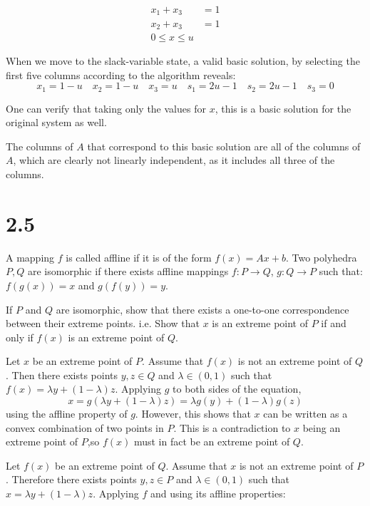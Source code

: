 \documentclass[12pt]{paper}
\begin{document}
\begin{align*}
  x_1 + x_3 &= 1\\
  x_2 + x_3 &= 1\\
  0 \leq x \leq u
\end{align*}

When we move to the slack-variable state, a valid basic solution, by
selecting the first five columns according to the algorithm reveals:
\begin{equation*}
  x_1 = 1 - u \quad x_2 = 1-u\quad x_3 = u\quad s_1 = 2u - 1\quad s_2 = 2u - 1\quad s_3 = 0
\end{equation*}

One can verify that taking only the values for $x$, this is a basic
solution for the original system as well.

The columns of $A$ that correspond to this basic solution are all of
the columns of $A$, which are clearly not linearly independent, as it
includes all three of the columns.



\section{2.5}

A mapping $f$ is called affline if it is of the form $f(x) = Ax +
b$. Two polyhedra $P,Q$ are isomorphic if there exists affline
mappings $f: P \rightarrow Q$, $g: Q \rightarrow P$ such that: $f(g(x))= x$ and $g(f(y)) =
y$.

If $P$ and $Q$ are isomorphic, show that there exists a one-to-one
correspondence between their extreme points. i.e. Show that $x$ is an
extreme point of $P$ if and only if $f(x)$ is an extreme point of $Q$.

\vspace{.3in}

Let $x$ be an extreme point of $P$. Assume that $f(x)$ is not an
extreme point of $Q$. Then there exists points $y,z \in Q$ and $\lambda \in
(0,1)$ such that $f(x) = \lambda y + (1-\lambda)z$. Applying $g$ to both sides of
the equation,
\begin{equation*}
  x = g(\lambda y + (1-\lambda)z) = \lambda g(y) + (1-\lambda)g(z)
\end{equation*}
using the affline property of $g$. However, this shows that $x$ can be
written as a convex combination of two points in $P$. This is a
contradiction to $x$ being an extreme point of $P$,so $f(x)$ must in
fact be an extreme point of $Q$.

\vspace{.3in}
Let $f(x)$ be an extreme point of $Q$. Assume that $x$ is not an
extreme point of $P$. Therefore there exists points $y,z \in P$ and $\lambda \in
(0,1)$ such that $x = \lambda y + (1-\lambda)z$. Applying $f$ and using its
affline properties:
\end{document}
